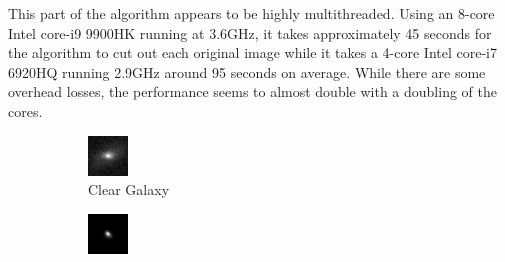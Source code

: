 \documentclass[a4paper,fleqn,usenatbib]{mnras}
\begin{document}
This part of the algorithm appears to be highly multithreaded. Using an 8-core Intel core-i9 9900HK running at 3.6GHz, it takes approximately 45 seconds for the algorithm to cut out each original image while it takes a 4-core Intel core-i7 6920HQ running 2.9GHz around 95 seconds on average. While there are some overhead losses, the performance seems to almost double with a doubling of the cores.

 \begin{figure}

 \begin{subfigure}{0.5\columnwidth}
 \includegraphics[width=\columnwidth]{../Figures/GalaxyExample} 
 \caption{Clear Galaxy}
 \label{fig:Galaxy1}
 \end{subfigure}
 \begin{subfigure}{0.5\columnwidth}
 \includegraphics[width=\columnwidth]{../Figures/StarExample}

\end{subfigure}
\end{figure}
\end{document}

